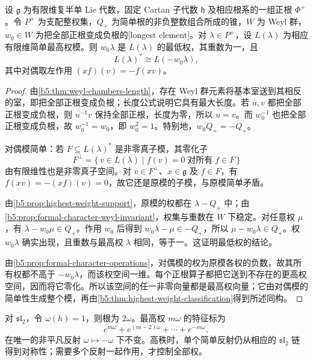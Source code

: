\begin{proposition}[对偶模的最高权]\label{b5:prop:dual-highest-weight}
	设 \(\mathfrak g\) 为有限维复半单 Lie 代数，固定 Cartan 子代数 \(\mathfrak h\) 及相应根系的一组正根 \(\Phi^+\)。令 \(P^+\) 为支配整权集，\(Q_+\) 为简单根的非负整数组合所成的锥，\(W\) 为 Weyl 群，\(w_0\in W\) 为把全部正根变成负根的[longest element]。对 \(\lambda\in P^+\)，设 \(L(\lambda)\) 为相应有限维简单最高权模。则 \(w_0\lambda\) 是 \(L(\lambda)\) 的最低权，其重数为一，且
	\[
		L(\lambda)^*\cong L(-w_0\lambda),
	\]
	其中对偶取左作用 \((xf)(v)=-f(xv)\)。
\end{proposition}
\begin{proof}
	由\cref{b5:thm:weyl-chambers-length}，存在 Weyl 群元素将基本室送到其相反的室，即把全部正根变成负根；长度公式说明它具有最大长度。若 \(u,v\) 都把全部正根变成负根，则 \(u^{-1}v\) 保持全部正根，长度为零，所以 \(u=v\)。而 \(w_0^{-1}\) 也把全部正根变成负根，故 \(w_0^{-1}=w_0\)，即 \(w_0^2=1\)。特别地，\(w_0Q_+=-Q_+\)。

	对偶模简单：若 \(F\subseteq L(\lambda)^*\) 是非零真子模，其零化子
	\[
		F^\perp=\{\,v\in L(\lambda)\mid f(v)=0\;\text{对所有}\;f\in F\,\}
	\]
	由有限维性也是非零真子空间。对 \(v\in F^\perp\)、\(x\in\mathfrak g\) 及 \(f\in F\)，有 \(f(xv)=-(xf)(v)=0\)，故它还是原模的子模，与原模简单矛盾。

	由\cref{b5:prop:highest-weight-support}，原模的权都在 \(\lambda-Q_+\) 中；由\cref{b5:prop:formal-character-weyl-invariant}，权集与重数在 \(W\) 下稳定。对任意权 \(\mu\)，有 \(\lambda-w_0\mu\in Q_+\)。作用 \(w_0\) 后得到 \(w_0\lambda-\mu\in-Q_+\)，所以 \(\mu-w_0\lambda\in Q_+\)。权 \(w_0\lambda\) 确实出现，且重数与最高权 \(\lambda\) 相同，等于一。这证明最低权的结论。

	由\cref{b5:prop:formal-character-operations}，对偶模的权为原模各权的负数，故其所有权都不高于 \(-w_0\lambda\)，而该权空间一维。每个正根算子都把它送到不存在的更高权空间，因而将它零化。所以该空间的任一非零向量都是最高权向量；它由对偶模的简单性生成整个模，再由\cref{b5:thm:highest-weight-classification}得到所述同构。
\end{proof}

对 \(\mathfrak{sl}_2\)，令 \(\omega(h)=1\)，则根为 \(2\omega\)。最高权 \(m\omega\) 的特征标为
\[
	e^{m\omega}+e^{(m-2)\omega}+\cdots+e^{-m\omega},
\]
在唯一的非平凡反射 \(\omega\mapsto-\omega\) 下不变。高秩时，单个简单反射仍从相应的 \(\mathfrak{sl}_2\) 链得到对称性；需要多个反射一起作用，才控制全部权。
